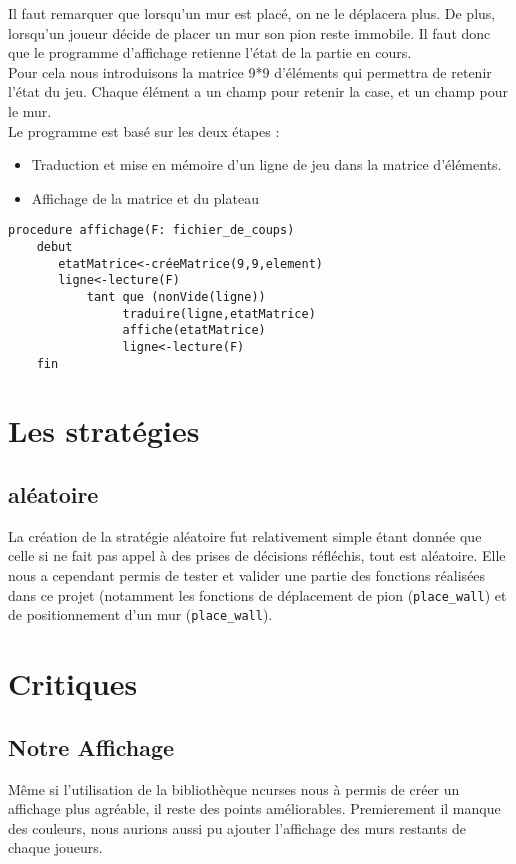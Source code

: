 \documentclass[a4paper, draft]{article}
\begin{document}
Il faut remarquer que lorsqu'un mur est placé, on ne le déplacera plus. De plus, lorsqu'un joueur décide de placer un mur son pion reste immobile. Il faut donc que le programme d'affichage retienne l'état de la partie en cours.
\\Pour cela nous introduisons la matrice 9*9 d'éléments qui permettra de retenir l'état du jeu. Chaque élément a un champ pour retenir la case,  et un champ pour le mur.
\\ Le programme est basé sur les deux étapes :
\begin{itemize}

  \item Traduction et mise en mémoire d'un ligne de jeu dans la matrice d'éléments.
  \item Affichage de la matrice et du plateau

\end{itemize}

\begin{center}
\begin{verbatim}
procedure affichage(F: fichier_de_coups)
    debut
       etatMatrice<-créeMatrice(9,9,element)
       ligne<-lecture(F)
           tant que (nonVide(ligne))
                traduire(ligne,etatMatrice)
                affiche(etatMatrice)
                ligne<-lecture(F)   
    fin
\end{verbatim}
\end{center}


\section{Les stratégies}
\subsection{aléatoire}

La création de la stratégie aléatoire fut relativement simple étant donnée que celle si ne fait pas appel à des prises de décisions réfléchis, tout est aléatoire. Elle nous a cependant
permis de tester et valider une partie des fonctions réalisées dans ce projet (notamment les fonctions de déplacement de pion (\verb?place_wall?) et de positionnement d'un mur (\verb?place_wall?).


\section{Critiques}
\subsection{Notre Affichage}
Même si l'utilisation de la bibliothèque ncurses nous à permis de créer un affichage plus agréable,
il reste des points améliorables. Premierement il manque des couleurs, nous aurions aussi pu ajouter l'affichage des murs restants de chaque joueurs.
\end{document}
